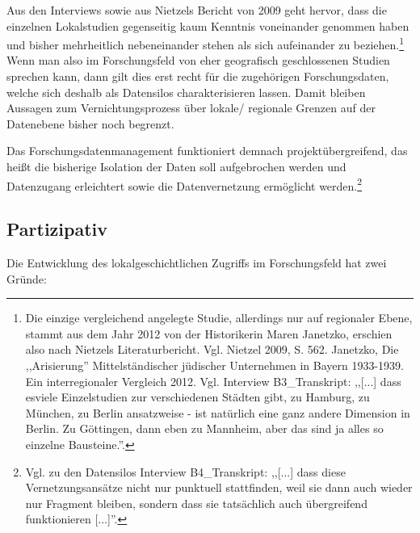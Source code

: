 Aus den Interviews sowie aus Nietzels Bericht von 2009 geht hervor, dass die einzelnen Lokalstudien gegenseitig kaum Kenntnis voneinander genommen haben und bisher mehrheitlich nebeneinander stehen als sich aufeinander zu beziehen.\footnote{Die einzige vergleichend angelegte Studie, allerdings nur auf regionaler Ebene, stammt aus dem Jahr 2012 von der Historikerin Maren Janetzko, erschien also nach Nietzels Literaturbericht. Vgl. Nietzel 2009, S. 562. Janetzko, Die ,,Arisierung'' Mittelständischer jüdischer Unternehmen in Bayern 1933-1939. Ein interregionaler Vergleich 2012. Vgl. Interview B3\_Transkript: ,,[...] dass esviele Einzelstudien zur verschiedenen Städten gibt, zu Hamburg, zu München, zu Berlin ansatzweise - ist natürlich eine ganz andere Dimension in Berlin. Zu Göttingen, dann eben zu Mannheim, aber das sind ja alles so einzelne Bausteine.''.} Wenn man also im Forschungsfeld von eher geografisch geschlossenen Studien sprechen kann, dann gilt dies erst recht für die zugehörigen Forschungsdaten, welche sich deshalb als Datensilos charakterisieren lassen. Damit bleiben Aussagen zum Vernichtungsprozess über lokale/ regionale Grenzen auf der Datenebene bisher noch begrenzt. 

Das Forschungsdatenmanagement funktioniert demnach projektübergreifend, das heißt die bisherige Isolation der Daten soll aufgebrochen werden und Datenzugang erleichtert sowie die Datenvernetzung ermöglicht werden.\footnote{Vgl. zu den Datensilos Interview B4\_Transkript: ,,[...] dass diese Vernetzungsansätze nicht nur punktuell stattfinden, weil sie dann auch wieder nur Fragment bleiben, sondern dass sie tatsächlich auch übergreifend funktionieren [...]''.}

\subsection{Partizipativ} 

Die Entwicklung des lokalgeschichtlichen Zugriffs im Forschungsfeld hat zwei Gründe:

